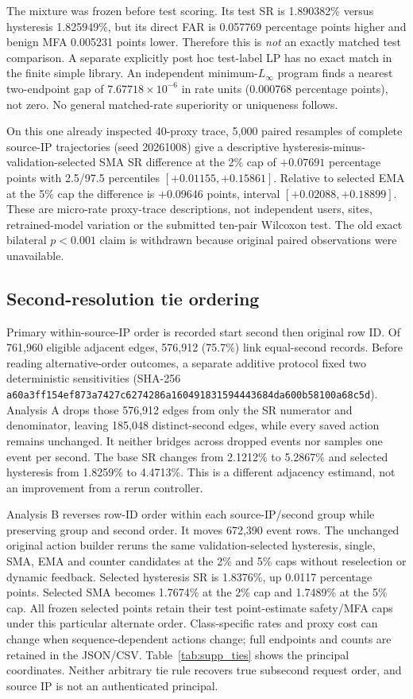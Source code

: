 \documentclass[10pt,onecolumn]{IEEEtran}
\begin{document}
The mixture was frozen before test scoring.
Its test SR is 1.890382\% versus hysteresis
1.825949\%, but its direct FAR is
0.057769 percentage points higher and
benign MFA 0.005231 points lower. Therefore
this is \emph{not} an exactly matched test
comparison. A separate explicitly post hoc
test-label LP has no exact match in the
finite simple library. An independent
minimum-\(L_\infty\) program finds a nearest
two-endpoint gap of
\(7.67718\times10^{-6}\) in rate units
(0.000768 percentage points), not zero.
No general matched-rate superiority or
uniqueness follows.


On this one already inspected 40-proxy trace,
5,000 paired resamples of complete source-IP
trajectories (seed 20261008) give a descriptive
hysteresis-minus-validation-selected SMA SR
difference at the 2\% cap of
\(+0.07691\) percentage points with
2.5/97.5 percentiles
\([+0.01155,+0.15861]\). Relative to
selected EMA at the 5\% cap the difference
is \(+0.09646\) points, interval
\([+0.02088,+0.18899]\).
These are micro-rate proxy-trace descriptions,
not independent users, sites, retrained-model
variation or the submitted ten-pair Wilcoxon
test. The old exact bilateral \(p<0.001\)
claim is withdrawn because original paired
observations were unavailable.

\subsection{Second-resolution tie ordering}
Primary within-source-IP order is recorded
start second then original row ID.
Of 761,960 eligible adjacent edges,
576,912 (75.7\%) link equal-second
records. Before reading alternative-order
outcomes, a separate additive protocol
fixed two deterministic sensitivities
(SHA-256
\texttt{a60a3ff154ef873a7427c6274286a160491831594443684da600b58100a68c5d}).
Analysis A drops those 576,912 edges
from only the SR numerator and denominator,
leaving 185,048 distinct-second edges,
while every saved action remains unchanged.
It neither bridges across dropped events
nor samples one event per second. The
base SR changes from 2.1212\% to 5.2867\%
and selected hysteresis from 1.8259\%
to 4.4713\%. This is a different
adjacency estimand, not an improvement
from a rerun controller.

Analysis B reverses row-ID order within
each source-IP/second group while
preserving group and second order.
It moves 672,390 event rows. The unchanged
original action builder reruns the same
validation-selected hysteresis, single,
SMA, EMA and counter candidates at the
2\% and 5\% caps without reselection
or dynamic feedback. Selected hysteresis
SR is 1.8376\%, up 0.0117 percentage
points. Selected SMA becomes 1.7674\%
at the 2\% cap and 1.7489\% at the 5\%
cap. All frozen selected points retain
their test point-estimate safety/MFA caps
under this particular alternate order.
Class-specific rates and proxy cost can
change when sequence-dependent actions
change; full endpoints and counts are
retained in the JSON/CSV.
Table~\ref{tab:supp_ties} shows the
principal coordinates. Neither arbitrary
tie rule recovers true subsecond
request order, and source IP is not an
authenticated principal.

\end{document}
